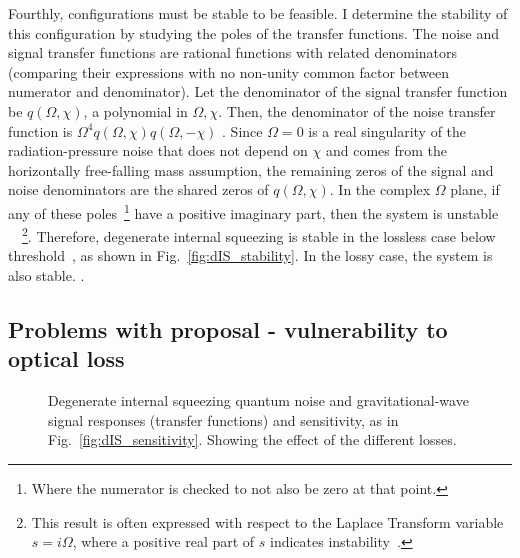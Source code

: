 Fourthly, configurations must be stable to be feasible. I determine the stability of this configuration by studying the poles of the transfer functions. 
The noise and signal transfer functions are rational functions with related denominators (comparing their expressions with no non-unity common factor between numerator and denominator). Let the denominator of the signal transfer function be $q(\Omega,\chi)$, a polynomial in $\Omega,\chi$. Then, the denominator of the noise transfer function is $\Omega^4 q(\Omega,\chi) q(\Omega,-\chi)$ . Since $\Omega=0$ is a real singularity of the radiation-pressure noise that does not depend on $\chi$ and comes from the horizontally free-falling mass assumption, the remaining zeros of the signal and noise denominators are the shared zeros of $q(\Omega,\chi)$. In the complex $\Omega$ plane, if any of these poles~\footnote{Where the numerator is checked to not also be zero at that point.} have a positive imaginary part, then the system is unstable ~\cite{}~\footnote{This result is often expressed with respect to the Laplace Transform variable $s=i\Omega$, where a positive real part of $s$ indicates instability~\cite{}.}. %
Therefore, degenerate internal squeezing is stable in the lossless case below threshold~\cite{}, as shown in Fig.~\ref{fig:dIS_stability}. In the lossy case, the system is also stable. .


\subsection{Problems with proposal - vulnerability to optical loss}
\label{sec:dIS_optical_loss}

\begin{figure}
	\centering
	\caption{Degenerate internal squeezing quantum noise and gravitational-wave signal responses (transfer functions) and sensitivity, as in Fig.~\ref{fig:dIS_sensitivity}. Showing the effect of the different losses.}
	\label{fig:dIS_loss_tolerance}
\end{figure}

